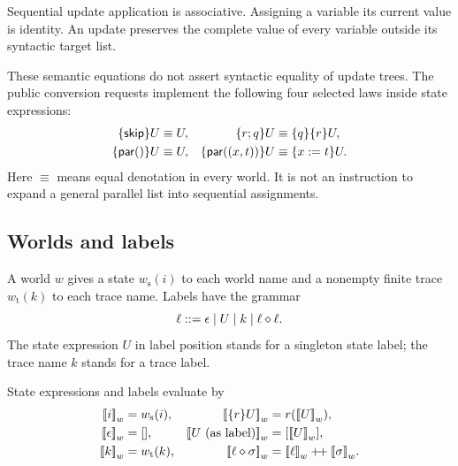 \begin{proposition}
Sequential update application is associative. Assigning a variable its
current value is identity. An update preserves the complete value of every
variable outside its syntactic target list.
\end{proposition}

These semantic equations do not assert syntactic equality of update trees.
The public conversion requests implement the following four selected laws
inside state expressions:
\begin{align*}
 \{\mathsf{skip}\}U&\equiv U,&
 \{r;q\}U&\equiv\{q\}\{r\}U,\\
 \{\mathsf{par}()\}U&\equiv U,&
 \{\mathsf{par}((x,t))\}U&\equiv\{x:=t\}U.
\end{align*}
Here $\equiv$ means equal denotation in every world. It is not an instruction
to expand a general parallel list into sequential assignments.

\subsection{Worlds and labels}
\begin{definition}
A world $w$ gives a state $w_{\mathrm{s}}(i)$ to each world name and a nonempty
finite trace $w_{\mathrm{t}}(k)$ to each trace name. Labels have the grammar
\[
 \ell\mathrel{::=}\epsilon\mid U\mid k\mid\ell\mathbin{\diamond}\ell.
\]
The state expression $U$ in label position stands for a singleton state label;
the trace name $k$ stands for a trace label.
\end{definition}

State expressions and labels evaluate by
\begin{align*}
 \eval{i}{w}&=w_{\mathrm{s}}(i),&
 \eval{\upd{r}{U}}{w}&=r(\eval{U}{w}),\\
 \eval{\epsilon}{w}&=[],&
 \eval{U\text{ (as label)}}{w}&=[\eval{U}{w}],\\
 \eval{k}{w}&=w_{\mathrm{t}}(k),&
 \eval{\ell\jlabel\sigma}{w}&=\eval{\ell}{w}\cat\eval{\sigma}{w}.
\end{align*}

